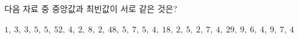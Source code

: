 다음 자료 중 중앙값과 최빈값이 서로 같은 것은?
\begin{choicesii}{$1,\ 3,\ 3,\ 5,\ 5,\ 5$}{$2,\ 4,\ 2,\ 8,\ 2,\ 4$}{$8,\ 5,\ 7,\ 5,\ 4,\ 1$}{$8,\ 2,\ 5,\ 2,\ 7,\ 4,\ 2$}{$9,\ 9,\ 6,\ 4,\ 9,\ 7,\ 4$}\end{choicesii}
